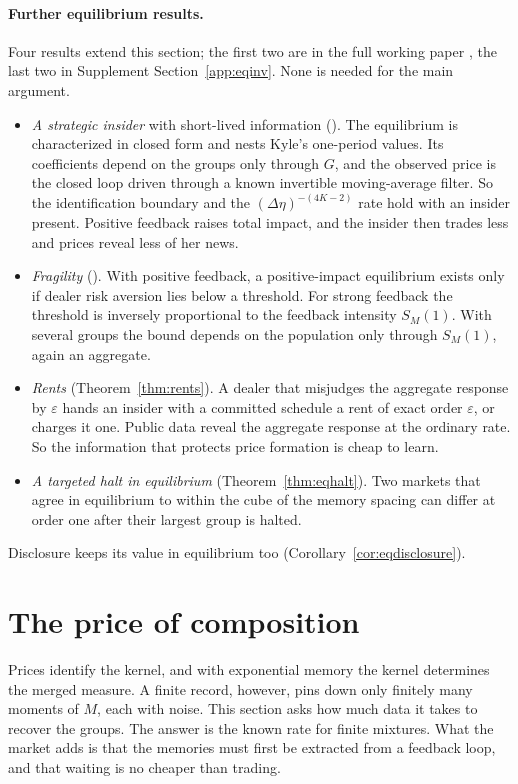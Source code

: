 \documentclass[12pt]{article}
\theoremstyle{definition}
\theoremstyle{remark}
\begin{document}
\paragraph{Further equilibrium results.} Four results extend this section; the first two are in the full working paper \citep{niroula2026full}, the last two in Supplement Section~\ref{app:eqinv}. None is needed for the main argument.
\begin{itemize}[itemsep=1pt,topsep=2pt]
\item \emph{A strategic insider} with short-lived information (\citealp[their Theorem~S9.3]{niroula2026full}). The equilibrium is characterized in closed form and nests Kyle's one-period values. Its coefficients depend on the groups only through $G$, and the observed price is the closed loop driven through a known invertible moving-average filter. So the identification boundary and the $(\Delta\eta)^{-(4K-2)}$ rate hold with an insider present. Positive feedback raises total impact, and the insider then trades less and prices reveal less of her news.
\item \emph{Fragility} (\citealp[their Theorem~S9.2]{niroula2026full}). With positive feedback, a positive-impact equilibrium exists only if dealer risk aversion lies below a threshold. For strong feedback the threshold is inversely proportional to the feedback intensity $S_M(1)$. With several groups the bound depends on the population only through $S_M(1)$, again an aggregate.
\item \emph{Rents} (Theorem~\ref{thm:rents}). A dealer that misjudges the aggregate response by $\varepsilon$ hands an insider with a committed schedule a rent of exact order $\varepsilon$, or charges it one. Public data reveal the aggregate response at the ordinary rate. So the information that protects price formation is cheap to learn.
\item \emph{A targeted halt in equilibrium} (Theorem~\ref{thm:eqhalt}). Two markets that agree in equilibrium to within the cube of the memory spacing can differ at order one after their largest group is halted.
\end{itemize}
Disclosure keeps its value in equilibrium too (Corollary~\ref{cor:eqdisclosure}).

\section{The price of composition}\label{sec:cost}

Prices identify the kernel, and with exponential memory the kernel determines the merged measure. A finite record, however, pins down only finitely many moments of $M$, each with noise. This section asks how much data it takes to recover the groups. The answer is the known rate for finite mixtures. What the market adds is that the memories must first be extracted from a feedback loop, and that waiting is no cheaper than trading.
\end{document}

